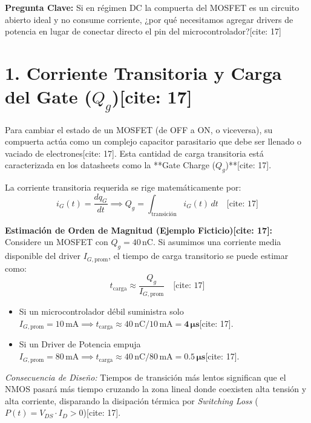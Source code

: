 \documentclass[11pt, a4paper]{article}
\begin{document}
\begin{tcolorbox}[colback=ucbblue!5, colframe=ucbblue, title=\textbf{Suplemento Técnico: Gate Charge ($Q_g$), Tiempos y el Buffer BJT[cite: 17]}]
    \textbf{Pregunta Clave:} Si en régimen DC la compuerta del MOSFET es un circuito abierto ideal y no consume corriente, ¿por qué necesitamos agregar drivers de potencia en lugar de conectar directo el pin del microcontrolador?[cite: 17]
\end{tcolorbox}

\section*{1. Corriente Transitoria y Carga del Gate ($Q_g$)[cite: 17]}
Para cambiar el estado de un MOSFET (de OFF a ON, o viceversa), su compuerta actúa como un complejo capacitor parasitario que debe ser llenado o vaciado de electrones[cite: 17]. Esta cantidad de carga transitoria está caracterizada en los datasheets como la **Gate Charge ($Q_g$)**[cite: 17].

La corriente transitoria requerida se rige matemáticamente por:
\begin{equation*}
    i_G(t) = \frac{dq_G}{dt} \implies Q_g = \int_{\text{transición}} i_G(t) \, dt \quad \text{[cite: 17]}
\end{equation*}

\textbf{Estimación de Orden de Magnitud (Ejemplo Ficticio)[cite: 17]:} \\
Considere un MOSFET con $Q_g = 40\,\text{nC}$. Si asumimos una corriente media disponible del driver $I_{G,\text{prom}}$, el tiempo de carga transitorio se puede estimar como:
\begin{equation*}
    t_{\text{carga}} \approx \frac{Q_g}{I_{G,\text{prom}}} \quad \text{[cite: 17]}
\end{equation*}
\begin{itemize}
    \item Si un microcontrolador débil suministra solo $I_{G,\text{prom}} = 10\,\text{mA} \implies t_{\text{carga}} \approx 40\,\text{nC} / 10\,\text{mA} = \mathbf{4\,\mu\text{s}}$[cite: 17].
    \item Si un Driver de Potencia empuja $I_{G,\text{prom}} = 80\,\text{mA} \implies t_{\text{carga}} \approx 40\,\text{nC} / 80\,\text{mA} = \mathbf{0.5\,\mu\text{s}}$[cite: 17].
\end{itemize}
\textit{Consecuencia de Diseño:} Tiempos de transición más lentos significan que el NMOS pasará más tiempo cruzando la zona lineal donde coexisten alta tensión y alta corriente, disparando la disipación térmica por \textit{Switching Loss} ($P(t) = V_{DS} \cdot I_D > 0$)[cite: 17]. 
\end{document}
